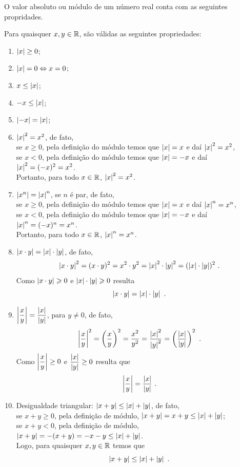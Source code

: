 O valor absoluto ou módulo de um número real conta com as seguintes propridades.

\begin{prop}
 Para quaisquer $x, y \in \mathbb{R}$, são válidas as seguintes propriedades: \label{prop.modulo}
\begin{enumerate}
 \item $\left|x\right| \geq 0$;
 \item $\left|x\right|= 0 \Leftrightarrow x= 0$;
 \item $x \leq \left|x\right|$;
 \item $-x \leq \left|x\right|$;
 \item $\left|-x\right|= \left|x\right|$;
 \item $\left|x\right|^2= x^2$, de fato,\\
 se $x \geq 0$, pela definição do módulo temos que $\left|x\right|= x$ e daí $\left|x\right|^2= x^2$, \\
 se $x < 0$, pela definição do módulo temos que $\left|x\right|= -x$ e daí $\left|x\right|^2=(-x)^2= x^2$.\\
 Portanto, para todo $x \in \mathbb{R}$, $\left|x\right|^2= x^2$.

 \item $\left|x^n\right|= \left|x\right|^n$, se $n$ é par, de fato, \\
 se $x \geq 0$, pela definição do módulo temos que $\left|x\right|= x$ e daí $\left|x\right|^n= x^n$, \\
 se $x < 0$, pela definição do módulo temos que $\left|x\right|= -x$ e daí $\left|x\right|^n= (-x)^n= x^n$.\\
 Portanto, para todo $x \in \mathbb{R}$, $\left|x\right|^n= x^n$.

 \item $\left|x \cdot y\right|= \left|x\right| \cdot \left|y\right|$, de fato, \\
 \[\left|x \cdot y\right|^2= (x \cdot y)^2= x^2 \cdot y^2= \left|x\right|^2 \cdot \left|y\right|^2= (\left|x\right| \cdot \left|y\right|)^2 \ .\]
 Como $\left|x \cdot y\right| \geqslant 0$ e $\left|x\right| \cdot \left|y\right| \geqslant 0$ resulta
 \[\left|x \cdot y\right|= \left|x\right| \cdot \left|y\right| \ . \]

 \item $\left|\dfrac{x}{y}\right|= \dfrac{\left|x\right|}{\left|y\right|}$, para $y \neq 0$, de fato, \\
 \[\left|\dfrac{x}{y}\right|^2= \left(\dfrac{x}{y} \right)^2= \dfrac{x^2}{y^2}= \dfrac{\left|x\right|^2}{\left|y\right|^2}= \left( \dfrac{\left|x\right|}{\left|y\right|} \right)^2 \ . \]
 Como $\left|\dfrac{x}{y}\right| \geq 0$ e $\dfrac{\left|x\right|}{\left|y\right|} \geq 0$ resulta que
 \[\left|\dfrac{x}{y}\right|= \dfrac{\left|x\right|}{\left|y\right|} \ .\]

 \item Desigualdade triangular: $\left|x+y\right|\leq \left|x\right|+\left|y\right|$, de fato, \\
 se $x + y \geqslant 0$, pela definição de módulo, $\left|x+y\right|= x+y \leq \left|x\right| + \left|y\right|$; \\
 se $x + y < 0$, pela definição de módulo, $\left|x+y\right|= -(x+y)= -x-y \leq \left|x\right| + \left|y\right|$. \\
 Logo, para quaisquer $x, y \in \mathbb{R}$ temos que
 \[\abs{x+y} \leq \abs{x}+\abs{y} \ .\]


\end{enumerate}
\end{prop}
